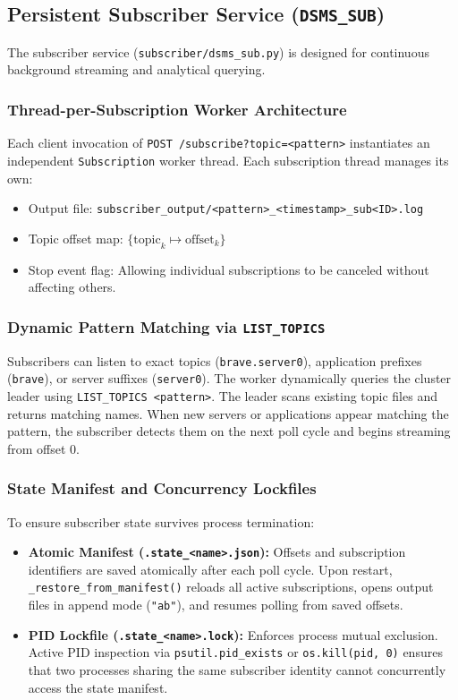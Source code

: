 \documentclass[11pt,a4paper]{article}
\begin{document}
\subsection{Persistent Subscriber Service (\texttt{DSMS\_SUB})}
The subscriber service (\texttt{subscriber/dsms\_sub.py}) is designed for continuous background streaming and analytical querying.

\subsubsection{Thread-per-Subscription Worker Architecture}
Each client invocation of \texttt{POST /subscribe?topic=<pattern>} instantiates an independent \texttt{Subscription} worker thread. Each subscription thread manages its own:
\begin{itemize}[leftmargin=*]
    \item Output file: \texttt{subscriber\_output/<pattern>\_<timestamp>\_sub<ID>.log}
    \item Topic offset map: $\{\text{topic}_k \mapsto \text{offset}_k\}$
    \item Stop event flag: Allowing individual subscriptions to be canceled without affecting others.
\end{itemize}

\subsubsection{Dynamic Pattern Matching via \texttt{LIST\_TOPICS}}
Subscribers can listen to exact topics (\texttt{brave.server0}), application prefixes (\texttt{brave}), or server suffixes (\texttt{server0}). The worker dynamically queries the cluster leader using \texttt{LIST\_TOPICS <pattern>}. The leader scans existing topic files and returns matching names. When new servers or applications appear matching the pattern, the subscriber detects them on the next poll cycle and begins streaming from offset 0.

\subsubsection{State Manifest and Concurrency Lockfiles}
To ensure subscriber state survives process termination:
\begin{itemize}[leftmargin=*]
    \item \textbf{Atomic Manifest (\texttt{.state\_<name>.json}):} Offsets and subscription identifiers are saved atomically after each poll cycle. Upon restart, \texttt{\_restore\_from\_manifest()} reloads all active subscriptions, opens output files in append mode (\texttt{"ab"}), and resumes polling from saved offsets.
    \item \textbf{PID Lockfile (\texttt{.state\_<name>.lock}):} Enforces process mutual exclusion. Active PID inspection via \texttt{psutil.pid\_exists} or \texttt{os.kill(pid, 0)} ensures that two processes sharing the same subscriber identity cannot concurrently access the state manifest.
\end{itemize}
\end{document}
